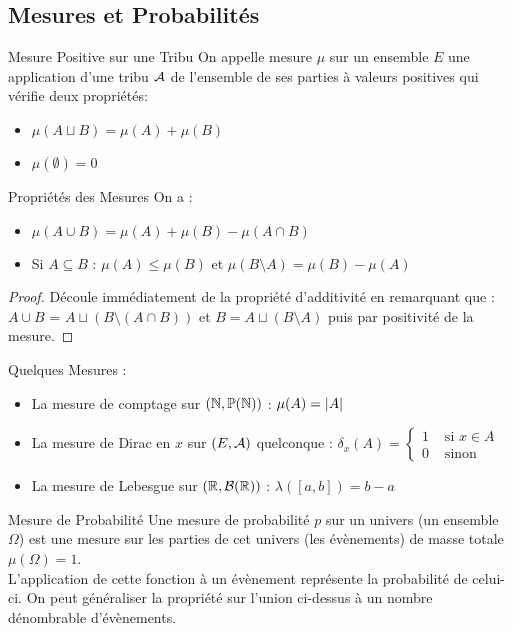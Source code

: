\documentclass{cours}
\begin{document}
\subsection{Mesures et Probabilités}
\begin{définition}{Mesure Positive sur une Tribu}{}
On appelle mesure $\mu$ sur un ensemble $E$ une application d'une tribu $\mathcal{A}$ de l'ensemble de ses parties à valeurs positives qui vérifie deux propriétés:
\begin{itemize}
    \item $\mu(A \sqcup B) = \mu(A) + \mu(B)$
    \item $\mu(\emptyset) = 0$
\end{itemize}
\end{définition}

\begin{propositionfr}{Propriétés des Mesures}{}
    On a\! :
    \begin{itemize}
        \item $\mu(A \cup B) = \mu(A) + \mu(B) - \mu(A \cap B)$
        \item Si $A \subseteq B$\! : $\mu(A) \leq \mu(B)$ et $\mu(B \setminus A) = \mu(B) - \mu(A)$
    \end{itemize}
\end{propositionfr}

\begin{proof}
    Découle immédiatement de la propriété d'additivité en remarquant que\! : $A \cup B$ = $A \sqcup \left(B \setminus \left(A \cap B\right)\right)$ et $B = A \sqcup \left(B \setminus A\right)$ puis par positivité de la mesure.
\end{proof}

Quelques Mesures\! :
\begin{itemize}
    \item La mesure de comptage sur $\left(\mathbb{N}, \mathbb{P}(\mathbb{N})\right)$\! : $\mu(A) = \left|A\right|$
    \item La mesure de Dirac en $x$ sur $\left(E, \mathcal{A}\right)$ quelconque\! : $\delta_{x}(A) = \begin{cases} 1 &\text{ si } x\in A\\ 0  &\text{ sinon} \end{cases}$
    \item La mesure de Lebesgue sur $\left(\mathbb{R}, \mathcal{B}(\mathbb{R})\right)$\! : $\lambda\left(\left[a, b\right]\right) = b - a$
\end{itemize}

\begin{définition}{Mesure de Probabilité}{}
Une mesure de probabilité $p$ sur un univers (un ensemble $\Omega$) est une mesure sur les parties de cet univers (les évènements) de masse totale $\mu(\Omega) = 1$.\\
L'application de cette fonction à un évènement représente la probabilité de celui-ci. On peut généraliser la propriété sur l'union ci-dessus à un nombre dénombrable d'évènements.
\end{définition}
\end{document}
